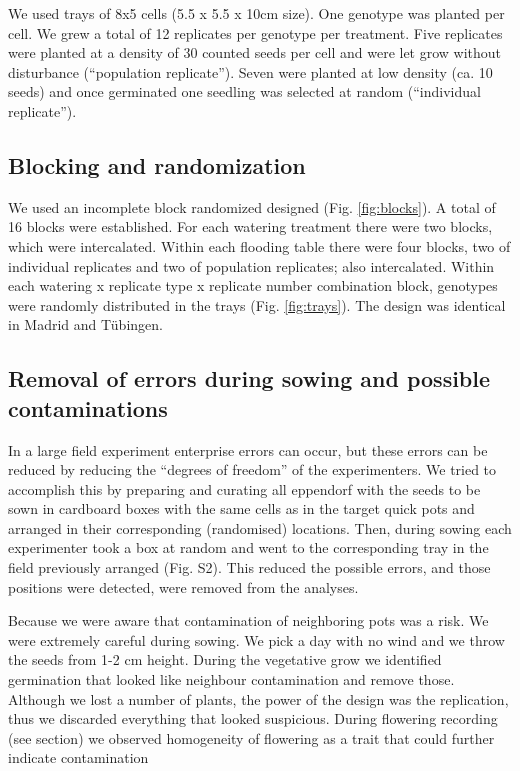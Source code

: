 \documentclass[12pt,]{article}
\begin{document}
We used trays of 8x5 cells (5.5 x 5.5 x 10cm size). One genotype was
planted per cell. We grew a total of 12 replicates per genotype per
treatment. Five replicates were planted at a density of 30 counted seeds
per cell and were let grow without disturbance (``population
replicate''). Seven were planted at low density (ca. 10 seeds) and once
germinated one seedling was selected at random (``individual
replicate'').

\subsection{Blocking and
randomization}\label{blocking-and-randomization}

We used an incomplete block randomized designed (Fig. \ref{fig:blocks}).
A total of 16 blocks were established. For each watering treatment there
were two blocks, which were intercalated. Within each flooding table
there were four blocks, two of individual replicates and two of
population replicates; also intercalated. Within each watering x
replicate type x replicate number combination block, genotypes were
randomly distributed in the trays (Fig. \ref{fig:trays}). The design was
identical in Madrid and Tübingen.

\subsection{Removal of errors during sowing and possible
contaminations}\label{removal-of-errors-during-sowing-and-possible-contaminations}

In a large field experiment enterprise errors can occur, but these
errors can be reduced by reducing the ``degrees of freedom'' of the
experimenters. We tried to accomplish this by preparing and curating all
eppendorf with the seeds to be sown in cardboard boxes with the same
cells as in the target quick pots and arranged in their corresponding
(randomised) locations. Then, during sowing each experimenter took a box
at random and went to the corresponding tray in the field previously
arranged (Fig. S2). This reduced the possible errors, and those
positions were detected, were removed from the analyses.

Because we were aware that contamination of neighboring pots was a risk.
We were extremely careful during sowing. We pick a day with no wind and
we throw the seeds from 1-2 cm height. During the vegetative grow we
identified germination that looked like neighbour contamination and
remove those. Although we lost a number of plants, the power of the
design was the replication, thus we discarded everything that looked
suspicious. During flowering recording (see section) we observed
homogeneity of flowering as a trait that could further indicate
contamination
\end{document}
